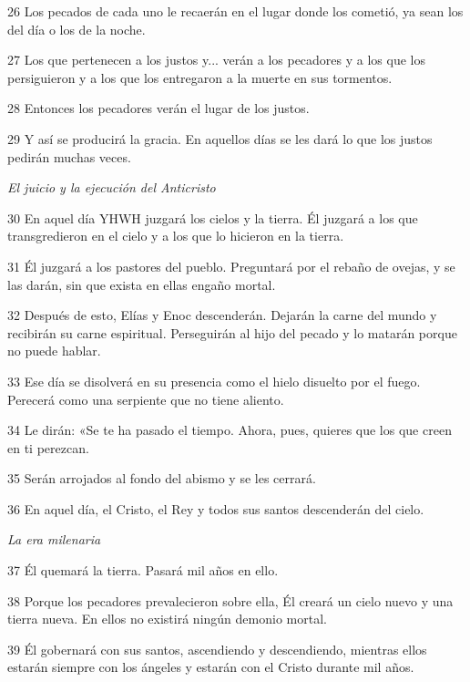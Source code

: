\par 26 Los pecados de cada uno le recaerán en el lugar donde los cometió, ya sean los del día o los de la noche.

\par 27 Los que pertenecen a los justos y... verán a los pecadores y a los que los persiguieron y a los que los entregaron a la muerte en sus tormentos.

\par 28 Entonces los pecadores verán el lugar de los justos.

\par 29 Y así se producirá la gracia. En aquellos días se les dará lo que los justos pedirán muchas veces.

\par \textit{El juicio y la ejecución del Anticristo}

\par 30 En aquel día YHWH juzgará los cielos y la tierra. Él juzgará a los que transgredieron en el cielo y a los que lo hicieron en la tierra.

\par 31 Él juzgará a los pastores del pueblo. Preguntará por el rebaño de ovejas, y se las darán, sin que exista en ellas engaño mortal.

\par 32 Después de esto, Elías y Enoc descenderán. Dejarán la carne del mundo y recibirán su carne espiritual. Perseguirán al hijo del pecado y lo matarán porque no puede hablar.

\par 33 Ese día se disolverá en su presencia como el hielo disuelto por el fuego. Perecerá como una serpiente que no tiene aliento.

\par 34 Le dirán: «Se te ha pasado el tiempo. Ahora, pues, quieres que los que creen en ti perezcan.

\par 35 Serán arrojados al fondo del abismo y se les cerrará.

\par 36 En aquel día, el Cristo, el Rey y todos sus santos descenderán del cielo.

\par \textit{La era milenaria}

\par 37 Él quemará la tierra. Pasará mil años en ello.

\par 38 Porque los pecadores prevalecieron sobre ella, Él creará un cielo nuevo y una tierra nueva. En ellos no existirá ningún demonio mortal.

\par 39 Él gobernará con sus santos, ascendiendo y descendiendo, mientras ellos estarán siempre con los ángeles y estarán con el Cristo durante mil años.

